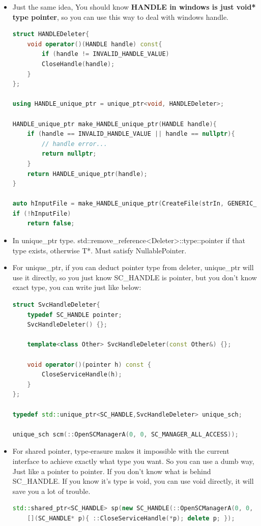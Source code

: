 \documentclass[a4paper,12pt,twoside]{book}
\begin{document}
\begin{itemize}
\item Just the same idea, You should know \textbf{HANDLE in windows is just void* type pointer}, so you can use this way to deal with windows handle.
	
\begin{lstlisting}[frame=single, language=c++]
struct HANDLEDeleter{
	void operator()(HANDLE handle) const{
		if (handle != INVALID_HANDLE_VALUE)
		CloseHandle(handle);
	}
};
	
using HANDLE_unique_ptr = unique_ptr<void, HANDLEDeleter>;
	
HANDLE_unique_ptr make_HANDLE_unique_ptr(HANDLE handle){
	if (handle == INVALID_HANDLE_VALUE || handle == nullptr){
		// handle error...
		return nullptr;
	}
	return HANDLE_unique_ptr(handle);
}
	
auto hInputFile = make_HANDLE_unique_ptr(CreateFile(strIn, GENERIC_READ, ...));
if (!hInputFile)
	return false;
\end{lstlisting}
	
\item In unique\_ptr type. std::remove\_reference<Deleter>::type::pointer if that type exists, otherwise T*. Must satisfy NullablePointer.
	
\item For unique\_ptr, if you can deduct pointer type from deleter, unique\_ptr will use it directly, so you just know SC\_HANDLE is pointer, but you don't know exact type, you can write just like below: 
\begin{lstlisting}[frame=single, language=c++]
struct SvcHandleDeleter{
	typedef SC_HANDLE pointer;
	SvcHandleDeleter() {};
	
	template<class Other> SvcHandleDeleter(const Other&) {};
	
	void operator()(pointer h) const {
		CloseServiceHandle(h);
	}
};
	
typedef std::unique_ptr<SC_HANDLE,SvcHandleDeleter> unique_sch;
	
unique_sch scm(::OpenSCManagerA(0, 0, SC_MANAGER_ALL_ACCESS));
\end{lstlisting}
	
	\item For shared pointer, type-erasure makes it impossible with the current interface to achieve exactly what type you want. So you can use a dumb way, Just like a pointer to pointer. If you don't know what is behind SC\_HANDLE. If you know it's type is void, you can use void directly, it will save you a lot of trouble. 
	
\begin{lstlisting}[frame=single, language=c++]
std::shared_ptr<SC_HANDLE> sp(new SC_HANDLE(::OpenSCManagerA(0, 0, SC_MANAGER_ALL_ACCESS)),
	[](SC_HANDLE* p){ ::CloseServiceHandle(*p); delete p; });
\end{lstlisting}
	


\end{itemize}
\end{document}
